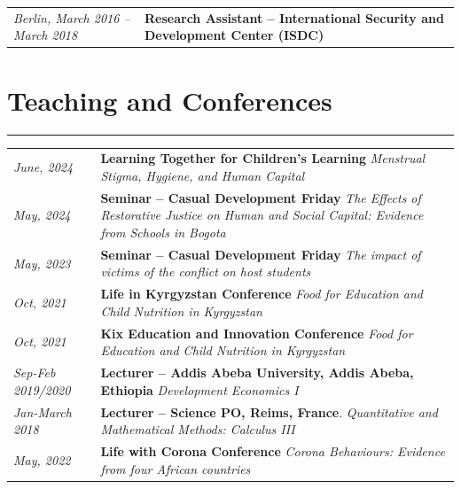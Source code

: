 \documentclass[letterpaper]{article}
\begin{document}
\begin{tabular}{p{4cm} p{12cm}}
\textit{Berlin, March 2016 -- March 2018} & \textbf{Research Assistant -- International Security and Development Center (ISDC)} \newline \\ %

\end{tabular}

\newpage
\vspace{-0.5cm}
\section*{\textbf{Teaching and Conferences} }
\hrule

\leftskip 0in
\begin{tabular}{p{4cm} p{12cm}}
\textit{June, 2024} & \textbf{Learning Together for Children's Learning} \newline \textit{Menstrual Stigma, Hygiene, and Human Capital} \\
\textit{May, 2024} & \textbf{Seminar -- Casual Development Friday} \newline \textit{The Effects of Restorative Justice on Human and Social Capital: Evidence from Schools in Bogota} \\
\textit{May, 2023} & \textbf{Seminar -- Casual Development Friday} \newline \textit{The impact of victims of the conflict on host students} \\
\textit{Oct, 2021} & \textbf{Life in Kyrgyzstan Conference} \newline \textit{Food for Education and Child Nutrition in Kyrgyzstan} \\
\textit{Oct, 2021} & \textbf{Kix Education and Innovation Conference} \newline \textit{Food for Education and Child Nutrition in Kyrgyzstan} \\
\textit{Sep-Feb 2019/2020} & {\bf Lecturer -- Addis Abeba University, Addis Abeba, Ethiopia} \newline \textit{Development Economics I} \\
\textit{Jan-March 2018} & {\bf Lecturer -- Science PO, Reims, France}. \newline \textit{Quantitative and Mathematical Methods: Calculus III} \\
\textit{May, 2022} & \textbf{Life with Corona Conference} \newline \textit{Corona Behaviours: Evidence from four African countries} 


\end{tabular}
\end{document}
